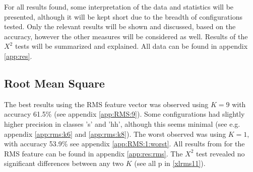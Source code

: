 	For all results found, some interpretation of the data and statistics will be presented, although it will be kept short due to the breadth of configurations tested. Only the relevant results will be shown and discussed, based on the accuracy, however the other measures will be considered as well. Results of the $X^2$ tests will be summarized and explained. All data can be found in appendix \ref{app:res}. 

	
	\subsection{Root Mean Square}

	
		The best results using the RMS feature vector was observed using $K=9$ with accuracy 61.5\% (see appendix \ref{app:RMS:9}). Some configurations had slightly higher precision in classes 's' and 'hh', although this seems minimal (see e.g. appendix  \ref{app:rms:k6} and \ref{app:rms:k8}). The worst observed was using $K=1$, with accuracy 53.9\% see appendix \ref{app:RMS:1:worst}. All results from for the RMS feature can be found in appendix \ref{app:res:rms}. The $X^2$ test revealed no significant differences between any two $K$ (see all p in \ref{xlrms11}).

		
	
